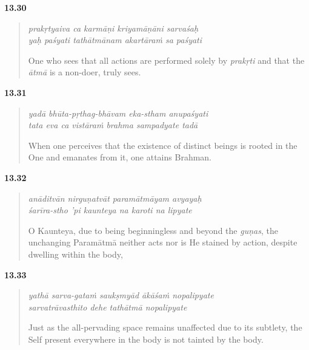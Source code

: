 \par\noindent\textbf{13.30}\par
\begin{verse}
\textit{prakṛtyaiva ca karmāṇi kriyamāṇāni sarvaśaḥ} \\
\textit{yaḥ paśyati tathātmānam akartāraṁ sa paśyati}

\noindent One who sees that all actions are performed solely by \textit{prakṛti} and that the \textit{ātmā} is a non-doer, truly sees.
\end{verse}
\par



\par\noindent\textbf{13.31}\par
\begin{verse}
\textit{yadā bhūta-pṛthag-bhāvam eka-stham anupaśyati} \\
\textit{tata eva ca vistāraṁ brahma sampadyate tadā}

\noindent When one perceives that the existence of distinct beings is rooted in the One and emanates from it, one attains Brahman.
\end{verse}
\par



\par\noindent\textbf{13.32}\par
\begin{verse}
\textit{anāditvān nirguṇatvāt paramātmāyam avyayaḥ} \\
\textit{śarīra-stho ’pi kaunteya na karoti na lipyate}

\noindent O Kaunteya, due to being beginningless and beyond the \textit{guṇas}, the unchanging Paramātmā neither acts nor is He stained by action, despite dwelling within the body,
\end{verse}
\par



\par\noindent\textbf{13.33}\par
\begin{verse}
\textit{yathā sarva-gataṁ saukṣmyād ākāśaṁ nopalipyate} \\
\textit{sarvatrāvasthito dehe tathātmā nopalipyate}

\noindent Just as the all-pervading space remains unaffected due to its subtlety, the Self present everywhere in the body is not tainted by the body.
\end{verse}
\par



